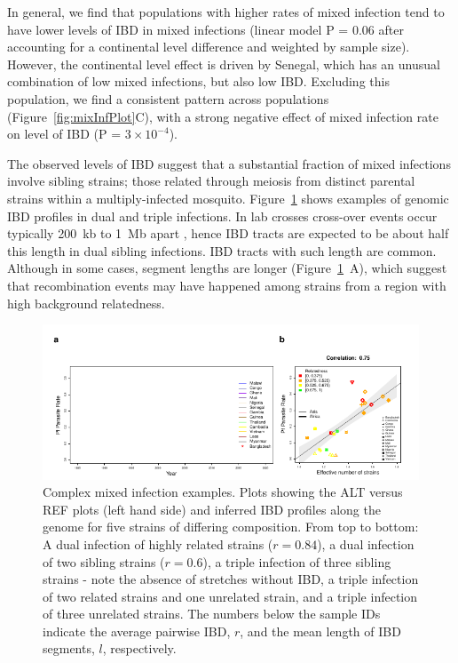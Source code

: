 \documentclass[9pt,lineno]{elife}
\begin{document}
In general, we find that populations with higher rates of mixed infection tend to have lower levels of IBD in mixed infections (linear model P = 0.06 after accounting for a continental level difference and weighted by sample size).  However, the continental level effect is driven by Senegal, which has an unusual combination of low mixed infections, but also low IBD.  Excluding this population, we find a consistent pattern across populations (Figure~\ref{fig:mixInfPlot}C), with a strong negative effect of mixed infection rate on level of IBD (P = $3\times10^{-4}$).

The observed levels of IBD suggest that a substantial fraction of mixed infections involve sibling strains; those related through meiosis from distinct parental strains within a multiply-infected mosquito.  Figure~\ref{fig:strainIBD} shows examples of genomic IBD profiles in dual and triple infections.  In lab crosses cross-over events occur typically 200~kb to 1~Mb apart \citet{Miles2016}, hence IBD tracts are expected to be about half this length in dual sibling infections. IBD tracts with such length are common. Although in some cases, segment lengths are longer (Figure~\ref{fig:strainIBD}~A), which suggest that recombination events may have happened among strains from a region with high background relatedness.

\begin{figure}[ht]
  \begin{center}
  \includegraphics[width=.8\textwidth]{Fig4.pdf}
    \caption{Complex mixed infection examples. Plots showing the ALT versus REF plots (left hand side) and inferred IBD profiles along the genome for five strains of differing composition.  From top to bottom: A dual infection of highly related strains ($r=0.84$), a dual infection of two sibling strains ($r=0.6$), a triple infection of three sibling strains - note the absence of stretches without IBD, a triple infection of two related strains and one unrelated strain, and a triple infection of three unrelated strains.  The numbers below the sample IDs indicate the average pairwise IBD, $r$, and the mean length of IBD segments, $l$, respectively.}\label{fig:strainIBD}
    \end{center}
\end{figure}
\end{document}
